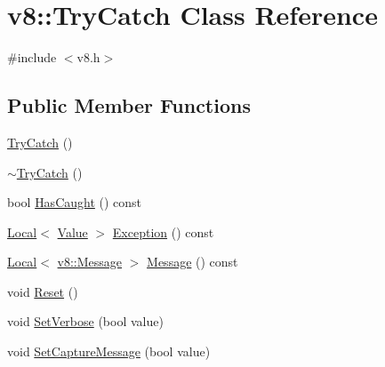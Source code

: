 \hypertarget{classv8_1_1_try_catch}{}\section{v8\+:\+:Try\+Catch Class Reference}
\label{classv8_1_1_try_catch}


{\ttfamily \#include $<$v8.\+h$>$}

\subsection*{Public Member Functions}
\begin{DoxyCompactItemize}
\item 
\hyperlink{classv8_1_1_try_catch_adc9b1b11e73b0325df727914c348053d}{Try\+Catch} ()
\item 
\hyperlink{classv8_1_1_try_catch_a2c9ad4b40d17dd31c6dd020736b30679}{$\sim$\+Try\+Catch} ()
\item 
bool \hyperlink{classv8_1_1_try_catch_a48f704fbf2b82564b5d2a4ff596e4137}{Has\+Caught} () const 
\item 
\hyperlink{classv8_1_1_local}{Local}$<$ \hyperlink{classv8_1_1_value}{Value} $>$ \hyperlink{classv8_1_1_try_catch_a99c425f29b3355b4294cbe762377f99b}{Exception} () const 
\item 
\hyperlink{classv8_1_1_local}{Local}$<$ \hyperlink{classv8_1_1_message}{v8\+::\+Message} $>$ \hyperlink{classv8_1_1_try_catch_a2811e500fbb906ee505895a3d94fc66f}{Message} () const 
\item 
void \hyperlink{classv8_1_1_try_catch_a3aae8acab4c99b374b7d782763d4c8e1}{Reset} ()
\item 
void \hyperlink{classv8_1_1_try_catch_a032cd889d76bd596e2616df11ced8682}{Set\+Verbose} (bool value)
\item 
void \hyperlink{classv8_1_1_try_catch_a541b8fa6951bd5a439692c22d5c7b73c}{Set\+Capture\+Message} (bool value)
\end{DoxyCompactItemize}
